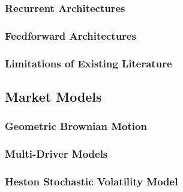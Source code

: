 

\subsubsection{Recurrent Architectures}



\subsubsection{Feedforward Architectures}



\subsubsection{Limitations of Existing Literature}




\subsection{Market Models}
\label{subsec:market_models}

\subsubsection{Geometric Brownian Motion}



\subsubsection{Multi-Driver Models}



\subsubsection{Heston Stochastic Volatility Model}

